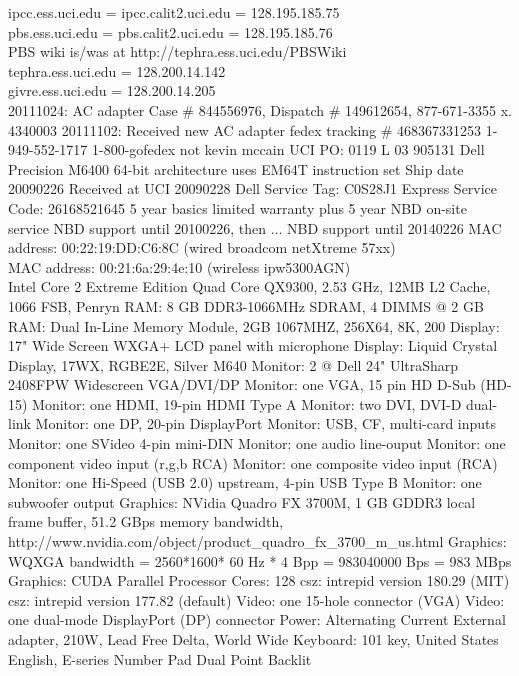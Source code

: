 \documentclass[12pt,twoside]{article}
\begin{document}
ipcc.ess.uci.edu = ipcc.calit2.uci.edu = 128.195.185.75\\
pbs.ess.uci.edu = pbs.calit2.uci.edu = 128.195.185.76\\
PBS wiki is/was at http://tephra.ess.uci.edu/PBSWiki\\
tephra.ess.uci.edu = 128.200.14.142\\

givre.ess.uci.edu = 128.200.14.205\\
20111024: AC adapter Case \# 844556976, Dispatch \# 149612654, 877-671-3355 x. 4340003
20111102: Received new AC adapter fedex tracking \# 468367331253 1-949-552-1717 1-800-gofedex not kevin mccain
UCI PO: 0119 L 03 905131
Dell Precision M6400
64-bit architecture uses EM64T instruction set
Ship date 20090226
Received at UCI 20090228
Dell Service Tag: C0S28J1
Express Service Code: 26168521645
5 year basics limited warranty plus 5 year NBD on-site service
NBD support until 20100226, then ...
NBD support until 20140226
MAC address: 00:22:19:DD:C6:8C (wired broadcom netXtreme 57xx) \\
MAC address: 00:21:6a:29:4e:10 (wireless ipw5300AGN) \\
Intel Core 2 Extreme Edition Quad Core QX9300, 2.53 GHz, 12MB L2 Cache, 1066 FSB, Penryn
RAM: 8 GB DDR3-1066MHz SDRAM, 4 DIMMS @ 2 GB
RAM: Dual In-Line Memory Module, 2GB 1067MHZ, 256X64, 8K, 200
Display: 17" Wide Screen WXGA+ LCD panel with microphone
Display: Liquid Crystal Display, 17WX, RGBE2E, Silver M640
Monitor: 2 @ Dell 24" UltraSharp 2408FPW Widescreen VGA/DVI/DP
Monitor: one VGA, 15 pin HD D-Sub (HD-15)
Monitor: one HDMI, 19-pin HDMI Type A
Monitor: two DVI, DVI-D dual-link
Monitor: one DP, 20-pin DisplayPort
Monitor: USB, CF, multi-card inputs
Monitor: one SVideo 4-pin mini-DIN
Monitor: one audio line-ouput
Monitor: one component video input (r,g,b RCA)
Monitor: one composite video input (RCA)
Monitor: one Hi-Speed (USB 2.0) upstream, 4-pin USB Type B
Monitor: one subwoofer output
Graphics: NVidia Quadro FX 3700M, 1 GB GDDR3 local frame buffer, 51.2 GBps memory bandwidth, http://www.nvidia.com/object/product\_quadro\_fx\_3700\_m\_us.html
Graphics: WQXGA bandwidth = 2560*1600* 60 Hz * 4 Bpp = 983040000 Bps = 983 MBps
Graphics: CUDA Parallel Processor Cores: 128
csz: intrepid version 180.29 (MIT)
csz: intrepid version 177.82 (default)
Video: one 15-hole connector (VGA)
Video: one dual-mode DisplayPort (DP) connector 
Power: Alternating Current External adapter, 210W, Lead Free Delta, World Wide
Keyboard: 101 key, United States English, E-series Number Pad Dual Point Backlit
\end{document}
